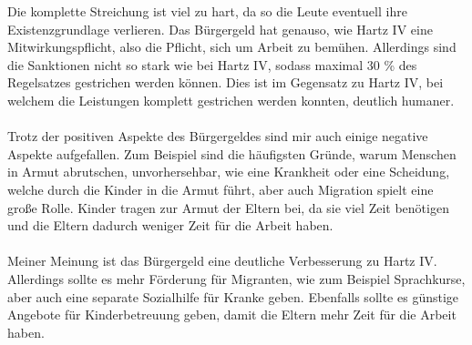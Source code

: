 \documentclass[11pt,a4paper]{article}
\begin{document}
    Die komplette Streichung ist viel zu hart, da so die Leute eventuell ihre Existenzgrundlage verlieren.
    Das Bürgergeld hat genauso, wie Hartz IV eine Mitwirkungspflicht, also die Pflicht, sich um Arbeit zu bemühen.
    Allerdings sind die Sanktionen nicht so stark wie bei Hartz IV, sodass maximal 30 \% des Regelsatzes gestrichen werden können.
    Dies ist im Gegensatz zu Hartz IV, bei welchem die Leistungen komplett gestrichen werden konnten, deutlich humaner.
    \\\\
    Trotz der positiven Aspekte des Bürgergeldes sind mir auch einige negative Aspekte aufgefallen.
    Zum Beispiel sind die häufigsten Gründe, warum Menschen in Armut abrutschen, unvorhersehbar, wie eine Krankheit oder eine Scheidung, welche durch die Kinder in die Armut führt, aber auch Migration spielt eine große Rolle.
    Kinder tragen zur Armut der Eltern bei, da sie viel Zeit benötigen und die Eltern dadurch weniger Zeit für die Arbeit haben.
    \\\\
    Meiner Meinung ist das Bürgergeld eine deutliche Verbesserung zu Hartz IV.
    Allerdings sollte es mehr Förderung für Migranten, wie zum Beispiel Sprachkurse, aber auch eine separate Sozialhilfe für Kranke geben.
    Ebenfalls sollte es günstige Angebote für Kinderbetreuung geben, damit die Eltern mehr Zeit für die Arbeit haben.
\end{document}

